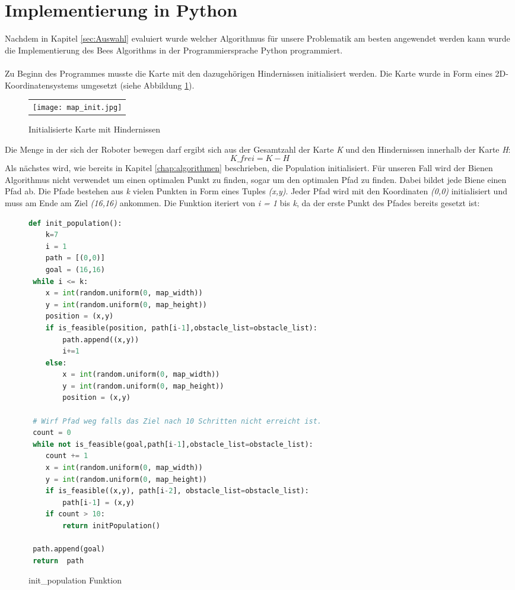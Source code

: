\section{Implementierung in Python}

Nachdem in Kapitel \ref{sec:Auswahl} evaluiert wurde welcher Algorithmus für unsere Problematik am besten angewendet werden kann wurde die Implementierung des \glqq Bees Algorithms\grqq{} in der Programmiersprache Python programmiert.\\\\
Zu Beginn des Programmes musste die Karte mit den dazugehörigen Hindernissen initialisiert werden. Die Karte wurde in Form eines 2D-Koordinatensystems umgesetzt (siehe Abbildung \ref{fig:map_init}).
\begin{figure}[H]
    \begin{tabular}{@{}r@{}} 
        \texttt{[image: map\_init.jpg]}
    \end{tabular}
    \caption{Initialisierte Karte mit Hindernissen\\}   
    \label{fig:map_init}
\end{figure}
Die Menge in der sich der Roboter bewegen darf ergibt sich aus der Gesamtzahl der Karte \emph{K} und den Hindernissen innerhalb der Karte \emph{H}:
\[K\_frei = K - H\]
Als nächstes wird, wie bereits in Kapitel \ref{chap:algorithmen} beschrieben, die Population initialisiert. Für unseren Fall wird der Bienen Algorithmus nicht verwendet um einen optimalen Punkt zu finden, sogar um den optimalen Pfad zu finden. Dabei bildet jede Biene einen Pfad ab. Die Pfade bestehen aus \emph{k} vielen Punkten in Form eines Tuples \emph{(x,y)}. Jeder Pfad wird mit den Koordinaten \emph{(0,0)} initialisiert und muss am Ende am Ziel \emph{(16,16)} ankommen. Die Funktion iteriert von \emph{i = 1} bis \emph{k}, da der erste Punkt des Pfades bereits gesetzt ist:
\begin{figure}[H]
    \begin{lstlisting}[language=python]
def init_population():
    k=7
    i = 1
    path = [(0,0)]
    goal = (16,16)
 while i <= k:
    x = int(random.uniform(0, map_width))
    y = int(random.uniform(0, map_height))
    position = (x,y)
    if is_feasible(position, path[i-1],obstacle_list=obstacle_list):
        path.append((x,y))
        i+=1
    else: 
        x = int(random.uniform(0, map_width))
        y = int(random.uniform(0, map_height))
        position = (x,y)
            
 # Wirf Pfad weg falls das Ziel nach 10 Schritten nicht erreicht ist.
 count = 0
 while not is_feasible(goal,path[i-1],obstacle_list=obstacle_list):
    count += 1
    x = int(random.uniform(0, map_width))
    y = int(random.uniform(0, map_height))
    if is_feasible((x,y), path[i-2], obstacle_list=obstacle_list):
        path[i-1] = (x,y)
    if count > 10:
        return initPopulation()   
    
 path.append(goal)
 return  path
\end{lstlisting}
\caption{init\_population Funktion}
\label{fig:init}
\end{figure} 
